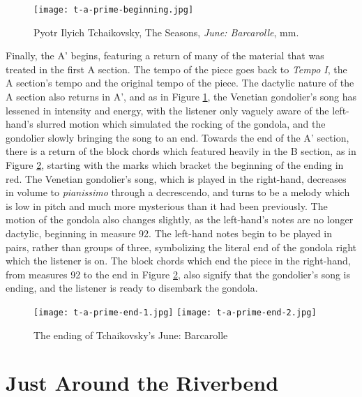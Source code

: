 \begin{figure}
  \centering
  \texttt{[image: t-a-prime-beginning.jpg]}
  \caption{Pyotr Ilyich Tchaikovsky, The Seasons, \textit{June: Barcarolle}, mm. }
  \label{fig:t-a-prime-beginning}
\end{figure}


Finally, the A' begins, featuring a return of many of the material that was treated in the first A section. The tempo of the piece goes back to \textit{Tempo I}, the A section's tempo and the original tempo of the piece. The dactylic nature of the A section also returns in A', and as in Figure \ref{fig:t-a-prime-beginning}\autocite{Henle_2002}, the Venetian gondolier's song has lessened in intensity and energy, with the listener only vaguely aware of the left-hand's slurred motion which simulated the rocking of the gondola, and the gondolier slowly bringing the song to an end. Towards the end of the A' section, there is a return of the block chords which featured heavily in the B section, as in Figure \ref{fig:t-a-prime-ending}\autocite{Henle_2002}, starting with the marks which bracket the beginning of the ending in red. The Venetian gondolier's song, which is played in the right-hand, decreases in volume to \textit{pianissimo} through a decrescendo, and turns to be a melody which is low in pitch and much more mysterious than it had been previously. The motion of the gondola also changes slightly, as the left-hand's notes are no longer dactylic, beginning in measure 92. The left-hand notes begin to be played in pairs, rather than groups of three, symbolizing the literal end of the gondola right which the listener is on. The block chords which end the piece in the right-hand, from measures 92 to the end in Figure \ref{fig:t-a-prime-ending}\autocite{Henle_2002}, also signify that the gondolier's song is ending, and the listener is ready to disembark the gondola.

\begin{figure}
  \centering
  \texttt{[image: t-a-prime-end-1.jpg]}
  \texttt{[image: t-a-prime-end-2.jpg]}
  \caption{The ending of Tchaikovsky's June: Barcarolle}
  \label{fig:t-a-prime-ending}
\end{figure}

\section{Just Around the Riverbend}

